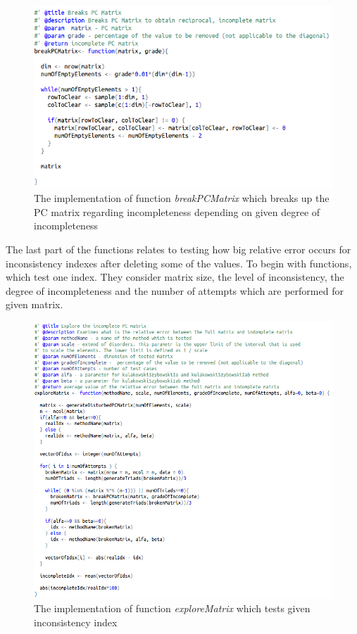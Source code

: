 \begin{figure}[h]
\centerline{\includegraphics[scale=0.73]{images/kod13.png}}
\caption{The implementation of function \textit{breakPCMatrix} which breaks up the PC matrix regarding incompleteness depending on given degree of incompleteness}
\label{fig:rstudio}
\end{figure}

The last part of the functions relates to testing how big relative error occurs for inconsistency indexes after deleting some of the values. To begin with functions, which test one index. They consider matrix size, the level of inconsistency, the degree of incompleteness and the number of attempts which are performed for given matrix.

\begin{figure}[h]
\centerline{\includegraphics[scale=0.58]{images/kod21.png}}
\caption{The implementation of function \textit{exploreMatrix} which tests given inconsistency index}
\label{fig:rstudio}
\end{figure}

